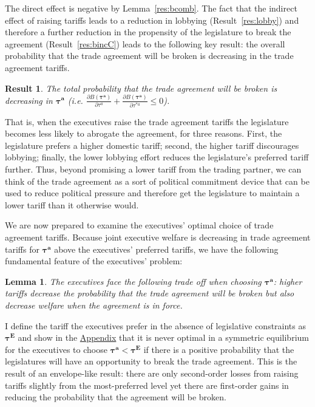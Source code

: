 \documentclass[10pt]{article}
\newtheorem{lemma}{Lemma}
\newtheorem{result}{Result}
\newcommand{\bta}{\bm{\tau^a}}
\begin{document}
The direct effect is negative by Lemma~\ref{res:bcomb}. The fact that the indirect effect of raising tariffs leads to a reduction in lobbying (Result~\ref{res:lobby}) and therefore a further reduction in the propensity of the legislature to break the agreement (Result~\ref{res:bincC}) leads to the following key result: the overall probability that the trade agreement will be broken is decreasing in the trade agreement tariffs.
 
\begin{result}
	The total probability that the trade agreement will be broken is decreasing in $\bta$ (i.e. $\frac{\partial B(\bta)}{\partial  \tau^a} + \frac{\partial B(\bta)}{\partial  \tau^{*a}} \leq 0$).
	\label{res:bcomB}
\end{result}

\noindent That is, when the executives raise the trade agreement tariffs the legislature becomes less likely to abrogate the agreement, for three reasons. First, the legislature prefers a higher domestic tariff; second, the higher tariff discourages lobbying; finally, the lower lobbying effort reduces the legislature's preferred tariff further. Thus, beyond promising a lower tariff from the trading partner, we can think of the trade agreement as a sort of political commitment device that can be used to reduce political pressure and therefore get the legislature to maintain a lower tariff than it otherwise would.

We are now prepared to examine the executives' optimal choice of trade agreement tariffs. Because joint executive welfare is decreasing in trade agreement tariffs for $\bta$ above the executives' preferred tariffs, we have the following fundamental feature of the executives' problem:
\begin{lemma}
  The executives face the following trade off when choosing $\bta$: higher tariffs decrease the probability that the trade agreement will be broken but also decrease welfare when the agreement is in force.
  \label{res:to}
\end{lemma}
I define the tariff the executives prefer in the absence of legislative constraints as $\bm{\tau^E}$ and show in the \hyperlink{int_soln}{Appendix} that it is never optimal in a symmetric equilibrium for the executives to choose $\bm{\tau^a} < \bm{\tau^E}$ if there is a positive probability that the legislatures will have an opportunity to break the trade agreement. This is the result of an envelope-like result: there are only second-order losses from raising tariffs slightly from the most-preferred level yet there are first-order gains in reducing the probability that the agreement will be broken.
\end{document}
